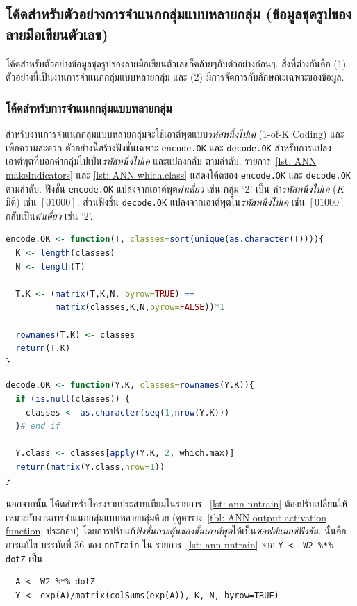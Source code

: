 \subsection{โค้ดสำหรับตัวอย่างการจำแนกกลุ่มแบบหลายกลุ่ม (ข้อมูลชุดรูปของลายมือเขียนตัวเลข)}
\label{sec: ann app multiclass code}


โค้ดสำหรับตัวอย่างข้อมูลชุดรูปของลายมือเขียนตัวเลขก็คล้ายๆกับตัวอย่างก่อนๆ.
สิ่งที่ต่างกันคือ (1) ตัวอย่างนี้เป็นงานการจำแนกกลุ่มแบบหลายกลุ่ม และ (2) มีการจัดการกับลักษณะเฉพาะของข้อมูล.

\subsubsection{โค้ดสำหรับการจำแนกกลุ่มแบบหลายกลุ่ม}

สำหรับงานการจำแนกกลุ่มแบบหลายกลุ่มจะใช้เอาต์พุตแบบ\textit{รหัสหนึ่งไปเค} (1-of-K Coding) 
และเพื่อความสะดวก ตัวอย่างนี้สร้างฟังชั่นเฉพาะ \texttt{encode.OK} และ \texttt{decode.OK} สำหรับการแปลงเอาต์พุตที่บอกค่ากลุ่มไปเป็น\textit{รหัสหนึ่งไปเค} และแปลงกลับ ตามลำดับ.
รายการ~\ref{lst: ANN makeIndicators} และ \ref{lst: ANN which.class} 
แสดงโค้ดของ \texttt{encode.OK} และ \texttt{decode.OK} ตามลำดับ.
ฟังชั่น \texttt{encode.OK} แปลงจากเอาต์พุต\textit{ค่าเดี่ยว} เช่น กลุ่ม `2' เป็น ค่า\textit{รหัสหนึ่งไปเค} ($K$ มิติ) เช่น $[01000]$.
ส่วนฟังชั่น \texttt{decode.OK} แปลงจากเอาต์พุตใน\textit{รหัสหนึ่งไปเค} เช่น $[01000]$ กลับเป็น\textit{ค่าเดี่ยว} เช่น `2'.

\begin{lstlisting}[language=R,caption={โค้ดฟังชั่น \texttt{encode.OK}},
label={lst: ANN makeIndicators}]
encode.OK <- function(T, classes=sort(unique(as.character(T)))){
  K <- length(classes)
  N <- length(T)

  T.K <- (matrix(T,K,N, byrow=TRUE) == 
          matrix(classes,K,N,byrow=FALSE))*1

  rownames(T.K) <- classes
  return(T.K)
}
\end{lstlisting}

\begin{lstlisting}[language=R,caption={โค้ดฟังชั่น \texttt{decode.OK}},
label={lst: ANN which.class}]
decode.OK <- function(Y.K, classes=rownames(Y.K)){
  if (is.null(classes)) {
    classes <- as.character(seq(1,nrow(Y.K)))
  }# end if

  Y.class <- classes[apply(Y.K, 2, which.max)]
  return(matrix(Y.class,nrow=1))
}
\end{lstlisting}

นอกจากนั้น โค้ดสำหรับโครงข่ายประสาทเทียมในรายการ
~\ref{lst: ann nntrain} ต้องปรับเปลี่ยนให้เหมาะกับงานการจำแนกกลุ่มแบบหลายกลุ่มด้วย (ดูตาราง~\ref{tbl: ANN output activation function} ประกอบ) โดยการปรับแก้\textit{ฟังชั่นกระตุ้นของชั้นเอาต์พุต}ให้เป็น\textit{ซอฟต์แมกซ์ฟังชั่น}.
นั่นคือ
การแก้ไข
บรรทัดที่ 36 ของ \texttt{nnTrain} ใน รายการ~\ref{lst: ann nntrain}
จาก \texttt{Y <- W2 \%*\% dotZ} เป็น
\begin{verbatim}
  A <- W2 %*% dotZ
  Y <- exp(A)/matrix(colSums(exp(A)), K, N, byrow=TRUE)  
\end{verbatim}

